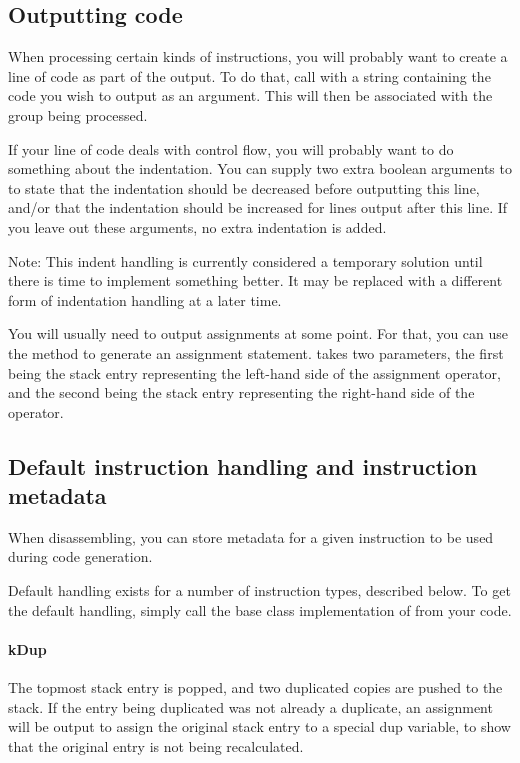 \subsection{Outputting code}
When processing certain kinds of instructions, you will probably want to create a line of code as part of the output. To do that, call  with a string containing the code you wish to output as an argument. This will then be associated with the group being processed.

If your line of code deals with control flow, you will probably want to do something about the indentation. You can supply two extra boolean arguments to  to state that the indentation should be decreased before outputting this line, and/or that the indentation should be increased for lines output after this line. If you leave out these arguments, no extra indentation is added.

Note: This indent handling is currently considered a temporary solution until there is time to implement something better. It may be replaced with a different form of indentation handling at a later time.

You will usually need to output assignments at some point. For that, you can use the  method to generate an assignment statement.  takes two parameters, the first being the stack entry representing the left-hand side of the assignment operator, and the second being the stack entry representing the right-hand side of the operator.

\subsection{Default instruction handling and instruction metadata}
When disassembling, you can store metadata for a given instruction to be used during code generation.

Default handling exists for a number of instruction types, described below. To get the default handling, simply call the base class implementation of  from your code.
\paragraph{kDup}
The topmost stack entry is popped, and two duplicated copies are pushed to the stack. If the entry being duplicated was not already a duplicate, an assignment will be output to assign the original stack entry to a special dup variable, to show that the original entry is not being recalculated.

